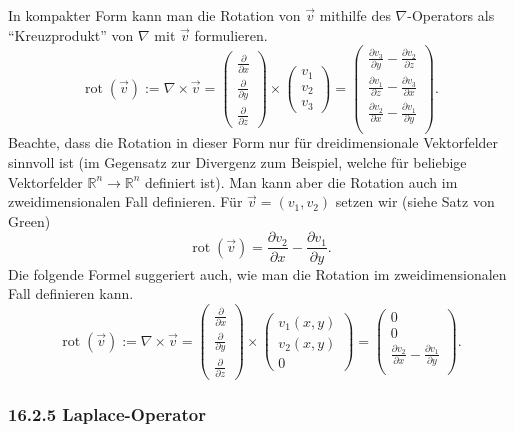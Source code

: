 \documentclass[a4paper,landscape,8pt]{extarticle}
\newcommand{\R}{\mathbb{R}}
\DeclareMathOperator{\rot}{rot}
\begin{document}
\begin{multicols*}{4}
In kompakter Form kann man die Rotation von $\vec{v}$ mithilfe des
$\nabla$-Operators als ``Kreuzprodukt'' von $\nabla$ mit $\vec{v}$ formulieren.
\[
\rot(\vec{v}):= \nabla\times\vec{v} = 
\begin{pmatrix}
\frac{\partial}{\partial x}\\
\frac{\partial}{\partial y}\\
\frac{\partial}{\partial z}
\end{pmatrix}
\times
\begin{pmatrix}
v_1\\
v_2\\
v_3
\end{pmatrix}
=
\begin{pmatrix}
\frac{\partial v_3}{\partial y} - \frac{\partial v_2}{\partial z}\\
\frac{\partial v_1}{\partial z} - \frac{\partial v_3}{\partial x}\\
\frac{\partial v_2}{\partial x} - \frac{\partial v_1}{\partial y}\\
\end{pmatrix}.
\]
Beachte, dass die Rotation in dieser Form nur für dreidimensionale Vektorfelder
sinnvoll ist (im Gegensatz zur Divergenz zum Beispiel, welche für beliebige
Vektorfelder $\R^n\to\R^n$ definiert ist). Man kann aber die Rotation auch im
zweidimensionalen Fall definieren. Für $\vec{v}=(v_1,v_2)$ setzen wir (siehe
Satz von Green)
\[
\rot(\vec{v})=\frac{\partial v_2}{\partial x}-\frac{\partial v_1}{\partial y}.
\]
Die folgende Formel suggeriert auch, wie man die Rotation im zweidimensionalen
Fall definieren kann.
\[
\rot(\vec{v}):= \nabla\times\vec{v} = 
\begin{pmatrix}
\frac{\partial}{\partial x}\\
\frac{\partial}{\partial y}\\
\frac{\partial}{\partial z}
\end{pmatrix}
\times
\begin{pmatrix}
v_1(x,y)\\
v_2(x,y)\\
0
\end{pmatrix}
=
\begin{pmatrix}
0\\
0\\
\frac{\partial v_2}{\partial x} - \frac{\partial v_1}{\partial y}\\
\end{pmatrix}.
\]

\subsubsection{16.2.5 Laplace-Operator}


\end{multicols*}
\end{document}
